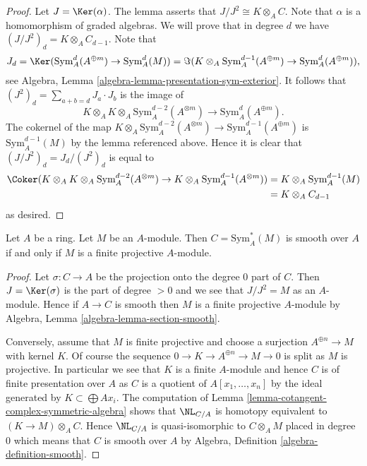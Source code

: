 \begin{proof}
Let $J = \Ker(\alpha)$. The lemma asserts that
$J/J^2 \cong K \otimes_A C$. Note that $\alpha$ is a homomorphism
of graded algebras. We will prove that in degree $d$ we have
$(J/J^2)_d = K \otimes_A C_{d - 1}$. Note that
$$
J_d = \Ker(\text{Sym}^d_A(A^{\oplus m}) \to \text{Sym}^d_A(M))
= \Im(K \otimes_A \text{Sym}^{d - 1}_A(A^{\oplus m})
\to \text{Sym}^d_A(A^{\oplus m})),
$$
see Algebra, Lemma \ref{algebra-lemma-presentation-sym-exterior}.
It follows that $(J^2)_d = \sum_{a + b = d} J_a \cdot J_b$ is the image of
$$
K \otimes_A K \otimes_A \text{Sym}^{d - 2}_A(A^{\otimes m})
\to \text{Sym}^d_A(A^{\oplus m}).
$$
The cokernel of the map $K \otimes_A \text{Sym}^{d - 2}_A(A^{\otimes m}) \to
\text{Sym}^{d - 1}_A(A^{\oplus m})$ is $\text{Sym}^{d - 1}_A(M)$ by
the lemma referenced above.
Hence it is clear that $(J/J^2)_d = J_d/(J^2)_d$ is equal to
\begin{align*}
\Coker(
K \otimes_A K \otimes_A \text{Sym}^{d - 2}_A(A^{\otimes m})
\to K \otimes_A \text{Sym}^{d - 1}_A(A^{\otimes m}))
& = K \otimes_A \text{Sym}^{d - 1}_A(M) \\
& = K \otimes_A C_{d -1}
\end{align*}
as desired.
\end{proof}

\begin{lemma}
\label{lemma-symmetric-algebra-smooth}
Let $A$ be a ring. Let $M$ be an $A$-module. Then $C = \text{Sym}_A^*(M)$
is smooth over $A$ if and only if $M$ is a finite projective $A$-module.
\end{lemma}

\begin{proof}
Let $\sigma : C \to A$ be the projection onto the degree $0$ part of $C$.
Then $J = \Ker(\sigma)$ is the part of degree $> 0$ and we see that
$J/J^2 = M$ as an $A$-module. Hence if $A \to C$ is smooth then $M$ is
a finite projective $A$-module by
Algebra, Lemma \ref{algebra-lemma-section-smooth}.

\medskip\noindent
Conversely, assume that $M$ is finite projective and choose a surjection
$A^{\oplus n} \to M$ with kernel $K$. Of course the sequence
$0 \to K \to A^{\oplus n} \to M \to 0$ is split as $M$ is projective.
In particular we see that $K$ is a finite $A$-module and hence
$C$ is of finite presentation over $A$ as $C$ is a quotient of
$A[x_1, \ldots, x_n]$ by the ideal generated by $K \subset \bigoplus Ax_i$.
The computation of Lemma \ref{lemma-cotangent-complex-symmetric-algebra}
shows that $\NL_{C/A}$ is homotopy equivalent to $(K \to M) \otimes_A C$.
Hence $\NL_{C/A}$ is quasi-isomorphic to $C \otimes_A M$ placed in degree
$0$ which means that $C$ is smooth over $A$ by
Algebra, Definition \ref{algebra-definition-smooth}.
\end{proof}

